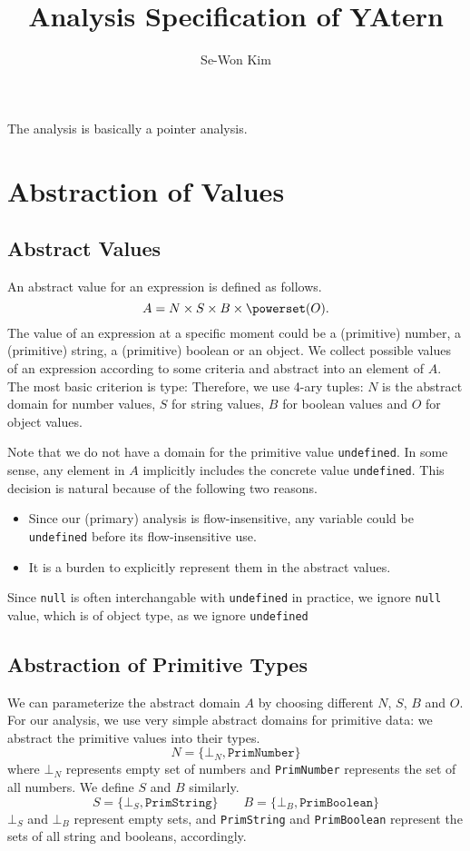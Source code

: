 \documentclass{report}
\begin{document}
\title{Analysis Specification of YAtern}
\author{Se-Won Kim}
\maketitle

The analysis is basically a pointer analysis.

\chapter{Abstraction of Values}
\section{Abstract Values}
An abstract value for an expression is defined as follows.
\[
A = N \times S \times B \times \powerset(O).
\]
The value of an expression at a specific moment could be a (primitive) number, 
a (primitive) string, a (primitive) boolean or an object.
We collect possible values of an expression according to some criteria 
and abstract into an element of $A$.
The most basic criterion is type:
Therefore, we use 4-ary tuples:
$N$ is the abstract domain for number values, 
$S$ for string values, $B$ for boolean values and $O$ for object values. 

Note that we do not have a domain for the primitive 
value \texttt{undefined}. 
In some sense, any element in $A$ implicitly includes 
the concrete value \texttt{undefined}.
This decision is natural because of the following two reasons.
\begin{itemize}
\item Since our (primary) analysis is flow-insensitive,
  any variable could be \texttt{undefined} before its flow-insensitive use.
\item It is a burden to explicitly represent them in the abstract values.
\end{itemize}
Since \texttt{null} is often interchangable 
with \texttt{undefined} in practice,
we ignore \texttt{null} value, which is of object type,
as we ignore \texttt{undefined} 

\section{Abstraction of Primitive Types}
We can parameterize the abstract domain $A$ by choosing 
different $N$, $S$, $B$ and $O$. 
For our analysis, we use very simple abstract domains for primitive data: 
we abstract the primitive values into their types.
\[
N = \{ \bot_N, \texttt{PrimNumber} \}
\]
where $\bot_N$ represents empty set of numbers and 
\texttt{PrimNumber} represents the set of all numbers. 
We define $S$ and $B$ similarly.
\[
S = \{ \bot_S, \texttt{PrimString} \}
\qquad
B = \{ \bot_B, \texttt{PrimBoolean} \}
\]
$\bot_S$ and $\bot_B$ represent empty sets, and \texttt{PrimString} and 
\texttt{PrimBoolean} represent the sets of all string and booleans, 
accordingly.
\end{document}
